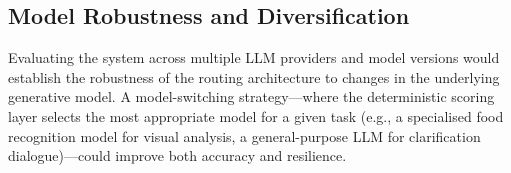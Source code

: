 \subsection{Model Robustness and Diversification}
Evaluating the system across multiple LLM providers and model versions would establish the robustness of the routing architecture to changes in the underlying generative model. A model-switching strategy---where the deterministic scoring layer selects the most appropriate model for a given task (e.g., a specialised food recognition model for visual analysis, a general-purpose LLM for clarification dialogue)---could improve both accuracy and resilience.
